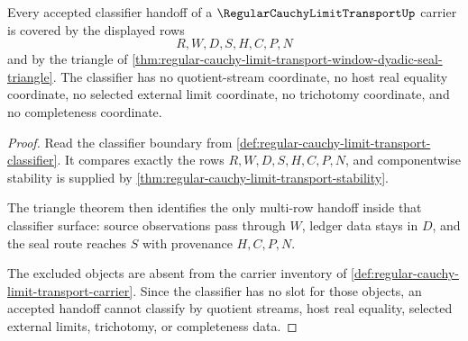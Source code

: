\begin{theorem}
\label{thm:regular-cauchy-limit-transport-classifier-handoff-coverage}
Every accepted classifier handoff of a $\RegularCauchyLimitTransportUp$ carrier is covered by the displayed rows
$$
R,W,D,S,H,C,P,N
$$
and by the triangle of \autoref{thm:regular-cauchy-limit-transport-window-dyadic-seal-triangle}. The classifier has no quotient-stream coordinate, no host real equality coordinate, no selected external limit coordinate, no trichotomy coordinate, and no completeness coordinate.
\end{theorem}
\begin{proof}
Read the classifier boundary from \autoref{def:regular-cauchy-limit-transport-classifier}. It compares exactly the rows $R,W,D,S,H,C,P,N$, and componentwise stability is supplied by \autoref{thm:regular-cauchy-limit-transport-stability}.

The triangle theorem then identifies the only multi-row handoff inside that classifier surface: source observations pass through $W$, ledger data stays in $D$, and the seal route reaches $S$ with provenance $H,C,P,N$.

The excluded objects are absent from the carrier inventory of \autoref{def:regular-cauchy-limit-transport-carrier}. Since the classifier has no slot for those objects, an accepted handoff cannot classify by quotient streams, host real equality, selected external limits, trichotomy, or completeness data.
\end{proof}

